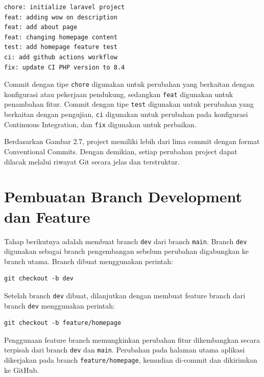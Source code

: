 \documentclass[a4paper,oneside,11pt]{book}
\begin{document}
\begin{lstlisting}
chore: initialize laravel project
feat: adding wow on description
feat: add about page
feat: changing homepage content
test: add homepage feature test
ci: add github actions workflow
fix: update CI PHP version to 8.4
\end{lstlisting}

Commit dengan tipe \texttt{chore} digunakan untuk perubahan yang berkaitan dengan konfigurasi atau pekerjaan pendukung, sedangkan \texttt{feat} digunakan untuk penambahan fitur. Commit dengan tipe \texttt{test} digunakan untuk perubahan yang berkaitan dengan pengujian, \texttt{ci} digunakan untuk perubahan pada konfigurasi Continuous Integration, dan \texttt{fix} digunakan untuk perbaikan.


Berdasarkan Gambar 2.7, project memiliki lebih dari lima commit dengan format Conventional Commits. Dengan demikian, setiap perubahan project dapat dilacak melalui riwayat Git secara jelas dan terstruktur.

\section{Pembuatan Branch Development dan Feature}

Tahap berikutnya adalah membuat branch \texttt{dev} dari branch \texttt{main}. Branch \texttt{dev} digunakan sebagai branch pengembangan sebelum perubahan digabungkan ke branch utama. Branch dibuat menggunakan perintah:

\begin{lstlisting}
git checkout -b dev
\end{lstlisting}

Setelah branch \texttt{dev} dibuat, dilanjutkan dengan membuat feature branch dari branch \texttt{dev} menggunakan perintah:

\begin{lstlisting}
git checkout -b feature/homepage
\end{lstlisting}

Penggunaan feature branch memungkinkan perubahan fitur dikembangkan secara terpisah dari branch \texttt{dev} dan \texttt{main}. Perubahan pada halaman utama aplikasi dikerjakan pada branch \texttt{feature/homepage}, kemudian di-commit dan dikirimkan ke GitHub.
\end{document}
